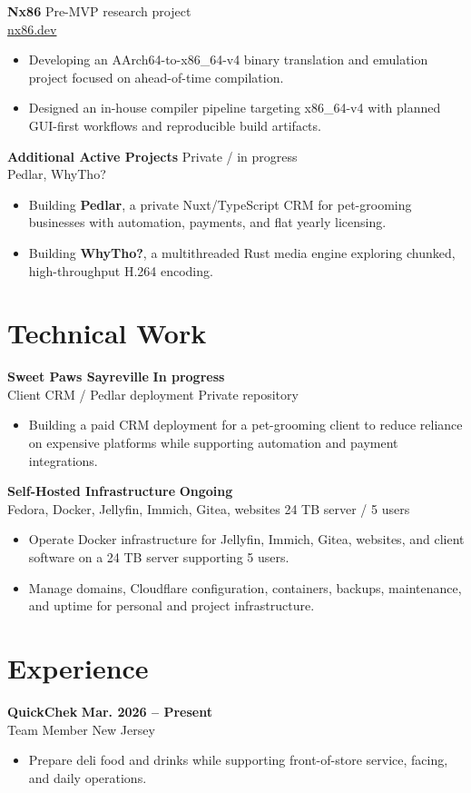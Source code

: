 \documentclass[10pt,letterpaper]{article}
\newcommand{\resumeItem}[1]{\item #1}
\newcommand{\resumeSubheading}[4]{%
  \textbf{#1} \hfill \textbf{#2}\\[-1pt]
  {\small #3} \hfill {\small #4}
}
\newcommand{\projectHeading}[3]{%
  \textbf{#1} \hfill {\small #2}\\[-1pt]
  {\small #3}
}
\begin{document}
\projectHeading{Nx86}{Pre-MVP research project}{\href{https://nx86.dev}{nx86.dev}}
\begin{itemize}
  \resumeItem{Developing an AArch64-to-x86\_64-v4 binary translation and emulation project focused on ahead-of-time compilation.}
  \resumeItem{Designed an in-house compiler pipeline targeting x86\_64-v4 with planned GUI-first workflows and reproducible build artifacts.}
\end{itemize}

\projectHeading{Additional Active Projects}{Private / in progress}{Pedlar, WhyTho?}
\begin{itemize}
  \resumeItem{Building \textbf{Pedlar}, a private Nuxt/TypeScript CRM for pet-grooming businesses with automation, payments, and flat yearly licensing.}
  \resumeItem{Building \textbf{WhyTho?}, a multithreaded Rust media engine exploring chunked, high-throughput H.264 encoding.}
\end{itemize}

\section{Technical Work}

\resumeSubheading{Sweet Paws Sayreville}{In progress}{Client CRM / Pedlar deployment}{Private repository}
\begin{itemize}
  \resumeItem{Building a paid CRM deployment for a pet-grooming client to reduce reliance on expensive platforms while supporting automation and payment integrations.}
\end{itemize}

\resumeSubheading{Self-Hosted Infrastructure}{Ongoing}{Fedora, Docker, Jellyfin, Immich, Gitea, websites}{24 TB server / 5 users}
\begin{itemize}
  \resumeItem{Operate Docker infrastructure for Jellyfin, Immich, Gitea, websites, and client software on a 24 TB server supporting 5 users.}
  \resumeItem{Manage domains, Cloudflare configuration, containers, backups, maintenance, and uptime for personal and project infrastructure.}
\end{itemize}

\section{Experience}

\resumeSubheading{QuickChek}{Mar. 2026 -- Present}{Team Member}{New Jersey}
\begin{itemize}
  \resumeItem{Prepare deli food and drinks while supporting front-of-store service, facing, and daily operations.}
\end{itemize}
\end{document}
